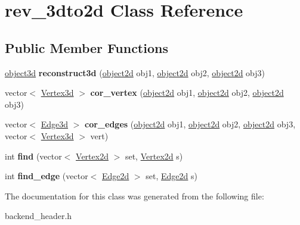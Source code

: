 \hypertarget{classrev__3dto2d}{}\section{rev\+\_\+3dto2d Class Reference}
\label{classrev__3dto2d}
\subsection*{Public Member Functions}
\begin{DoxyCompactItemize}
\item 
\hyperlink{classobject3d}{object3d} {\bfseries reconstruct3d} (\hyperlink{classobject2d}{object2d} obj1, \hyperlink{classobject2d}{object2d} obj2, \hyperlink{classobject2d}{object2d} obj3)\hypertarget{classrev__3dto2d_a30206736e5e95322b0dd301c596f32e1}{}\label{classrev__3dto2d_a30206736e5e95322b0dd301c596f32e1}

\item 
vector$<$ \hyperlink{classVertex3d}{Vertex3d} $>$ {\bfseries cor\+\_\+vertex} (\hyperlink{classobject2d}{object2d} obj1, \hyperlink{classobject2d}{object2d} obj2, \hyperlink{classobject2d}{object2d} obj3)\hypertarget{classrev__3dto2d_af83f643fa381b1f7689e77f00c55ea9a}{}\label{classrev__3dto2d_af83f643fa381b1f7689e77f00c55ea9a}

\item 
vector$<$ \hyperlink{classEdge3d}{Edge3d} $>$ {\bfseries cor\+\_\+edges} (\hyperlink{classobject2d}{object2d} obj1, \hyperlink{classobject2d}{object2d} obj2, \hyperlink{classobject2d}{object2d} obj3, vector$<$ \hyperlink{classVertex3d}{Vertex3d} $>$ vert)\hypertarget{classrev__3dto2d_a67089819dce28cd5e57ad691289590b2}{}\label{classrev__3dto2d_a67089819dce28cd5e57ad691289590b2}

\item 
int {\bfseries find} (vector$<$ \hyperlink{classVertex2d}{Vertex2d} $>$ set, \hyperlink{classVertex2d}{Vertex2d} s)\hypertarget{classrev__3dto2d_a64aff2d60828d570d02661dbd87eb78b}{}\label{classrev__3dto2d_a64aff2d60828d570d02661dbd87eb78b}

\item 
int {\bfseries find\+\_\+edge} (vector$<$ \hyperlink{classEdge2d}{Edge2d} $>$ set, \hyperlink{classEdge2d}{Edge2d} s)\hypertarget{classrev__3dto2d_a27a29f0711817222cae6d7f149051f48}{}\label{classrev__3dto2d_a27a29f0711817222cae6d7f149051f48}

\end{DoxyCompactItemize}


The documentation for this class was generated from the following file\+:\begin{DoxyCompactItemize}
\item 
backend\+\_\+header.\+h\end{DoxyCompactItemize}
